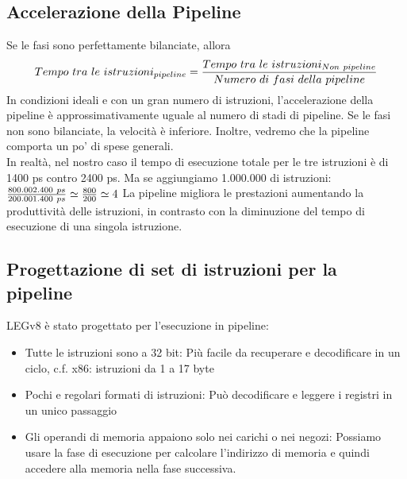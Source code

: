 \documentclass[12pt,a4paper]{article}
\begin{document}
\subsection{Accelerazione della Pipeline}
Se le fasi sono perfettamente bilanciate, allora
$$Tempo\ tra\ le\ istruzioni_{pipeline} = {Tempo\ tra\ le\ istruzioni_{Non\ pipeline} \over Numero\ di\ fasi\ della\ pipeline}$$
In condizioni ideali e con un gran numero di istruzioni, l'accelerazione della pipeline è approssimativamente uguale al numero di stadi di pipeline. Se le fasi non sono bilanciate, la velocità è inferiore. Inoltre, vedremo che la pipeline comporta un po' di spese generali.\\
In realtà, nel nostro caso il tempo di esecuzione totale per le tre istruzioni è di 1400 ps contro 2400 ps. Ma se aggiungiamo 1.000.000 di istruzioni: ${800.002.400\ ps \over 200.001.400\ ps} \simeq {800 \over 200} \simeq 4$
La pipeline migliora le prestazioni aumentando la produttività delle istruzioni, in contrasto con la diminuzione del tempo di esecuzione di una singola istruzione.

\subsection{Progettazione di set di istruzioni per la pipeline}
LEGv8 è stato progettato per l'esecuzione in pipeline:
\begin{itemize}
\item Tutte le istruzioni sono a 32 bit: Più facile da recuperare e decodificare in un ciclo, c.f. x86: istruzioni da 1 a 17 byte
\item Pochi e regolari formati di istruzioni: Può decodificare e leggere i registri in un unico passaggio
\item Gli operandi di memoria appaiono solo nei carichi o nei negozi: Possiamo usare la fase di esecuzione per calcolare l'indirizzo di memoria e quindi accedere alla memoria nella fase successiva.
\end{itemize}
\end{document}

